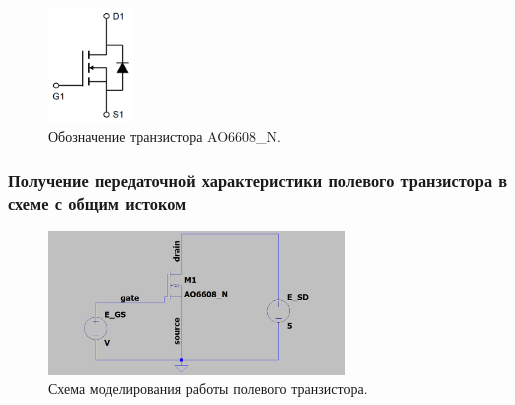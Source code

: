 \documentclass[12pt]{article}
\begin{document}
\begin{figure}[H]
    \centering
    \includegraphics[width=0.2\textwidth]{transistor_scheme.png}
    \caption{Обозначение транзистора AO6608\_N.}
    \label{fig:transistor_scheme}
\end{figure}

\subsubsection*{Получение передаточной характеристики полевого транзистора в схеме с общим истоком}
\begin{figure}[H]
    \centering
    \includegraphics[width=0.7\textwidth]{1_scheme.png}
    \caption{Схема моделирования работы полевого транзистора.}
    \label{fig:1_scheme}
\end{figure}
\end{document}
